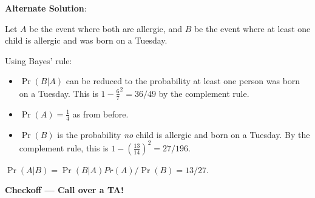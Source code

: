 \documentclass[12pt,letterpaper]{article}
\begin{document}
{\begin{enumerate}[a.]
    \textbf{Alternate Solution}:

    Let $A$ be the event where both are allergic, and $B$ be the event where at least one child is allergic and was born on a Tuesday.
    
    Using Bayes' rule:
    \begin{itemize}
        \item $\Pr(B | A)$ can be reduced to the probability at least one person was born on a Tuesday. This is $1 - \frac67^2=36/49$ by the complement rule. 
        \item $\Pr(A) = \frac14$ as from before.
        \item $\Pr(B)$ is the probability \textit{no} child is allergic and born on a Tuesday. By the complement rule, this is $1 - (\frac{13}{14})^2=27/196$.
    \end{itemize}
    $\Pr(A | B ) = \Pr(B | A)Pr(A)/\Pr(B)=13/27$.
    
\end{enumerate}}

\textbf{Checkoff — Call over a TA!}
\end{document}
